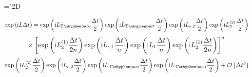 \documentclass[24pt]{article}
\begin{document}
\mathchardef\mhyphen="2D

\providecommand*{\iu}%
	{\ensuremath{{\rm i}}}


$$
\exp \left(\iu{} L \Delta t \right) =
\exp \left(\iu{} L_{\rm T\mhyphen baro} \frac{\Delta t}{2} \right)
\exp \left(\iu{} L_{\rm T\mhyphen part} \frac{\Delta t}{2} \right)
\exp \left(\iu{} L_{\epsilon , 2} \frac{\Delta t}{2} \right)
\exp \left(\iu{} L_{2}^{(2)} \frac{\Delta t}{2} \right)
$$
$$
\times \left[ 
\exp \left(\iu{} L_{2}^{(1)} \frac{\Delta t}{2n} \right)
\exp \left(\iu{} L_{\epsilon , 1} \frac{\Delta t}{n} \right)
\exp \left(\iu{} L_1 \frac{\Delta t}{n} \right)
\exp \left(\iu{} L_{2}^{(1)} \frac{\Delta t}{2n} \right)
\right]^n
$$
$$
\exp \left(\iu{} L_{2}^{(2)} \frac{\Delta t}{2} \right)
\exp \left(\iu{} L_{\epsilon , 2} \frac{\Delta t}{2} \right)
\exp \left(\iu{} L_{\rm T\mhyphen part} \frac{\Delta t}{2} \right)
\exp \left(\iu{} L_{\rm T\mhyphen baro} \frac{\Delta t}{2} \right)
+ \mathcal{O} \left(\Delta t^3 \right)
$$
\end{document}

